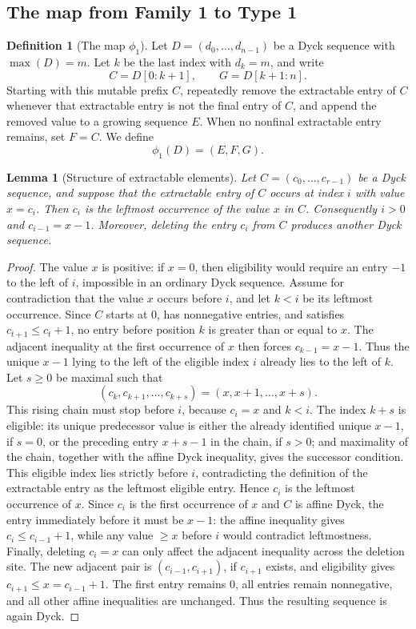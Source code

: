 \documentclass[11pt]{article}
\theoremstyle{plain}
\newtheorem{lemma}[theorem]{Lemma}
\theoremstyle{definition}
\newtheorem{definition}[theorem]{Definition}
\theoremstyle{remark}
\begin{document}
\subsection{The map from Family 1 to Type 1}
\begin{definition}[The map \(\phi_1\)]
\label{def:phi1}
Let \(D=(d_0,\ldots,d_{n-1})\) be a Dyck sequence with \(\max(D)=m\).
Let \(k\) be the last index with \(d_k=m\), and write
\[
  C=D[0:k+1],
  \qquad
  G=D[k+1:n].
\]
Starting with this mutable prefix \(C\), repeatedly remove the extractable
entry of \(C\) whenever that extractable entry is not the final entry of
\(C\), and append the removed value to a growing sequence \(E\).  When no
nonfinal extractable entry remains, set \(F=C\).  We define
\[
  \phi_1(D)=(E,F,G).
\]
\end{definition}
\begin{lemma}[Structure of extractable elements]
\label{lem:extractable-structure}
Let \(C=(c_0,\ldots,c_{r-1})\) be a Dyck sequence, and suppose that the
extractable entry of \(C\) occurs at index \(i\) with value \(x=c_i\).  Then
\(c_i\) is the leftmost occurrence of the value \(x\) in \(C\).  Consequently
\(i>0\) and \(c_{i-1}=x-1\).  Moreover, deleting the entry \(c_i\) from \(C\)
produces another Dyck sequence.
\end{lemma}
\begin{proof}
The value \(x\) is positive: if \(x=0\), then eligibility would require an
entry \(-1\) to the left of \(i\), impossible in an ordinary Dyck sequence.
Assume for contradiction that the value \(x\) occurs before \(i\), and let
\(k<i\) be its leftmost occurrence.  Since \(C\) starts at \(0\), has
nonnegative entries, and satisfies \(c_{t+1}\le c_t+1\), no entry before
position \(k\) is greater than or equal to \(x\).  The adjacent inequality at
the first occurrence of \(x\) then forces \(c_{k-1}=x-1\).  Thus the unique
\(x-1\) lying to the left of the eligible index \(i\) already lies to the left
of \(k\).
Let \(s\ge 0\) be maximal such that
\[
  (c_k,c_{k+1},\ldots,c_{k+s})=(x,x+1,\ldots,x+s).
\]
This rising chain must stop before \(i\), because \(c_i=x\) and \(k<i\).  The
index \(k+s\) is eligible: its unique predecessor value is either the already
identified unique \(x-1\), if \(s=0\), or the preceding entry \(x+s-1\) in the
chain, if \(s>0\); and maximality of the chain, together with the affine Dyck
inequality, gives the successor condition.  This eligible index lies strictly
before \(i\), contradicting the definition of the extractable entry as the
leftmost eligible entry.  Hence \(c_i\) is the leftmost occurrence of \(x\).
Since \(c_i\) is the first occurrence of \(x\) and \(C\) is affine Dyck, the
entry immediately before it must be \(x-1\): the affine inequality gives
\(c_i\le c_{i-1}+1\), while any value \(\ge x\) before \(i\) would contradict
leftmostness.  Finally, deleting \(c_i=x\) can only affect the adjacent
inequality across the deletion site.  The new adjacent pair is
\((c_{i-1},c_{i+1})\), if \(c_{i+1}\) exists, and eligibility gives
\(c_{i+1}\le x=c_{i-1}+1\).  The first entry remains \(0\), all entries remain
nonnegative, and all other affine inequalities are unchanged.  Thus the
resulting sequence is again Dyck.
\end{proof}
\end{document}
